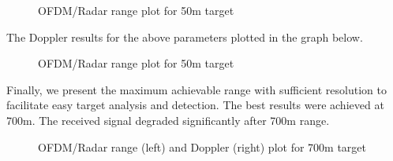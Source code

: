 \documentclass[conference]{IEEEtran}
\begin{document}
\begin{figure}[H]
\centering
{}
\caption{OFDM/Radar range plot for 50m target}
\end{figure} 
The Doppler results for the above parameters plotted in the graph below. 
\begin{figure}[H]
\centering
{}
\caption{OFDM/Radar range plot for 50m target}
\end{figure} 

Finally, we present the maximum achievable range with sufficient resolution to facilitate easy target analysis and detection. The best results were achieved at 700m. The received signal degraded significantly after 700m range. 

\begin{figure}[H]
\centering
{}
\caption{OFDM/Radar range (left) and Doppler (right) plot for 700m target}
\end{figure} 
\end{document}
